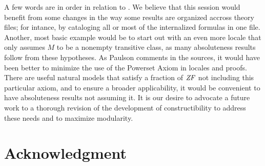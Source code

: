 A few words are in order in relation to .
We believe that this  session  would benefit from some changes in
the way some results are organized accross theory files; for
intance, by cataloging all or most of the internalized formulas in one
file. Another, most basic example would be to start out with an even
more locale that only assumes $M$ to be a nonempty transitive class,
as many absoluteness results follow from these hypotheses.
As Paulson comments in the sources, it would have been better to
minimize the use of the Powerset Axiom in locales and proofs. There
are  useful natural models that satisfy a fraction of $\mathit{ZF}$ not including
this particular axiom, and to ensure a broader applicability, it would
be convenient to have  absoluteness results not assuming it.
It is our desire to advocate a future work to a thorough
revision of the development of constructibility to address these needs
and to maximize modularity.


\section*{Acknowledgment}


